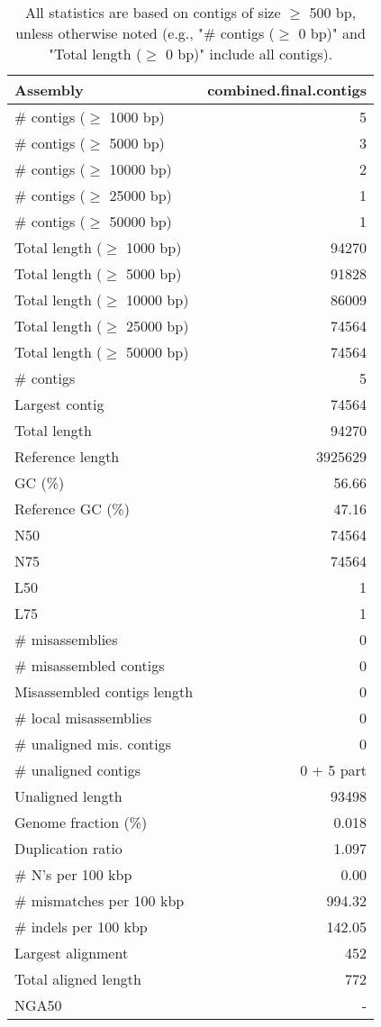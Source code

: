 \documentclass[12pt,a4paper]{article}
\begin{document}
\begin{table}[ht]
\begin{center}
\caption{All statistics are based on contigs of size $\geq$ 500 bp, unless otherwise noted (e.g., "\# contigs ($\geq$ 0 bp)" and "Total length ($\geq$ 0 bp)" include all contigs).}
\begin{tabular}{|l*{1}{|r}|}
\hline
Assembly & combined.final.contigs \\ \hline
\# contigs ($\geq$ 1000 bp) & 5 \\ \hline
\# contigs ($\geq$ 5000 bp) & 3 \\ \hline
\# contigs ($\geq$ 10000 bp) & 2 \\ \hline
\# contigs ($\geq$ 25000 bp) & 1 \\ \hline
\# contigs ($\geq$ 50000 bp) & 1 \\ \hline
Total length ($\geq$ 1000 bp) & 94270 \\ \hline
Total length ($\geq$ 5000 bp) & 91828 \\ \hline
Total length ($\geq$ 10000 bp) & 86009 \\ \hline
Total length ($\geq$ 25000 bp) & 74564 \\ \hline
Total length ($\geq$ 50000 bp) & 74564 \\ \hline
\# contigs & 5 \\ \hline
Largest contig & 74564 \\ \hline
Total length & 94270 \\ \hline
Reference length & 3925629 \\ \hline
GC (\%) & 56.66 \\ \hline
Reference GC (\%) & 47.16 \\ \hline
N50 & 74564 \\ \hline
N75 & 74564 \\ \hline
L50 & 1 \\ \hline
L75 & 1 \\ \hline
\# misassemblies & 0 \\ \hline
\# misassembled contigs & 0 \\ \hline
Misassembled contigs length & 0 \\ \hline
\# local misassemblies & 0 \\ \hline
\# unaligned mis. contigs & 0 \\ \hline
\# unaligned contigs & 0 + 5 part \\ \hline
Unaligned length & 93498 \\ \hline
Genome fraction (\%) & 0.018 \\ \hline
Duplication ratio & 1.097 \\ \hline
\# N's per 100 kbp & 0.00 \\ \hline
\# mismatches per 100 kbp & 994.32 \\ \hline
\# indels per 100 kbp & 142.05 \\ \hline
Largest alignment & 452 \\ \hline
Total aligned length & 772 \\ \hline
NGA50 & - \\ \hline
\end{tabular}
\end{center}
\end{table}
\end{document}
